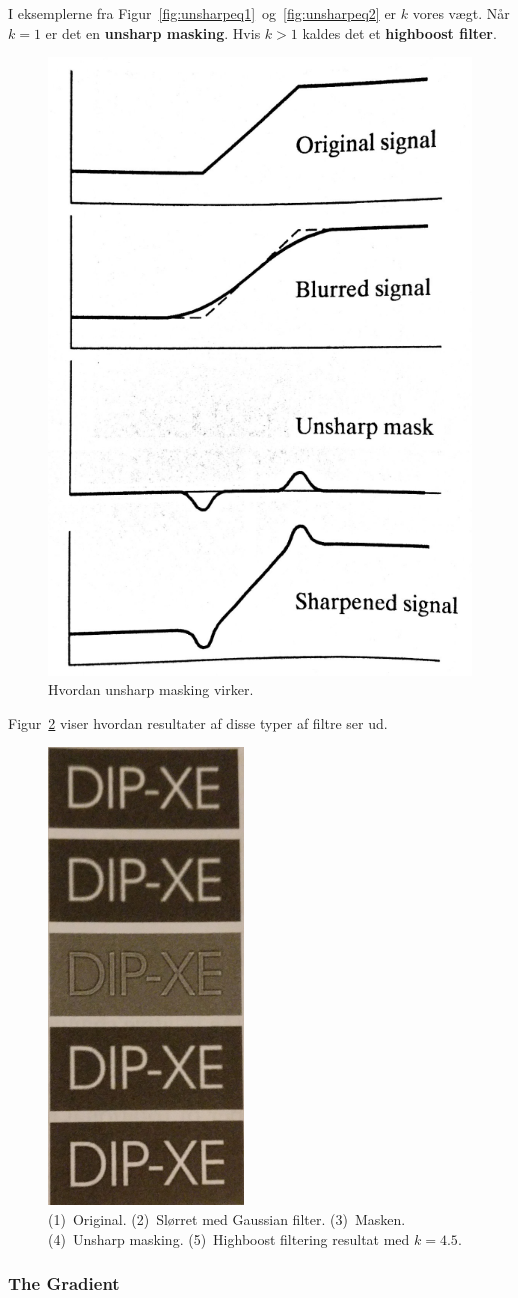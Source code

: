 I eksemplerne fra Figur~\ref{fig:unsharpeq1}~og~\ref{fig:unsharpeq2} er $k$ vores vægt. Når $k = 1$ er det en \textbf{unsharp masking}. Hvis $k > 1$ kaldes det et \textbf{highboost filter}.

\begin{figure}[H]
	\centering
	\includegraphics[width=0.4\linewidth]{figs/spm02/unsharp}
	\caption{Hvordan unsharp masking virker.}
	\label{fig:unsharp}
\end{figure}

Figur~\ref{fig:highboost} viser hvordan resultater af disse typer af filtre ser ud.

\begin{figure}[h]
	\centering
	\includegraphics[width=0.2\linewidth]{figs/spm02/highboost}
	\caption{(1)~Original. (2)~Slørret med Gaussian filter. (3)~Masken. (4)~Unsharp masking. (5)~Highboost filtering resultat med $k = 4.5$.}
	\label{fig:highboost}
\end{figure}

\subsubsection{The Gradient}

